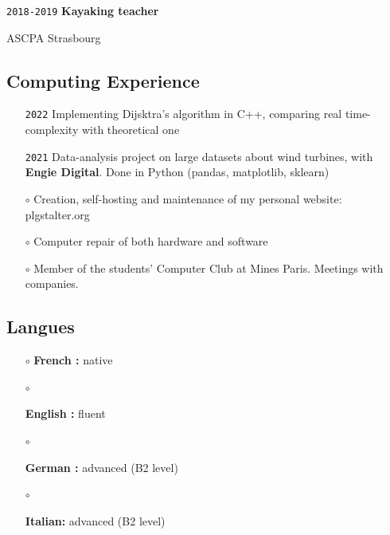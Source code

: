 \documentclass{article}
\begin{document}
\begin{multicols}{2}
		\noindent\texttt{2018-2019} \textbf{Kayaking teacher}

		ASCPA Strasbourg

\hfill

{\color{blue} \subsection*{Computing Experience}}

		\begin{itemize}
			\item[\texttt{2022}]
				Implementing Dijsktra's algorithm in C++, comparing real time-complexity with theoretical one
	
			\hfill

			\item[\texttt{2021}]
				Data-analysis project on large datasets about wind turbines, with \textbf{Engie Digital}. Done in Python (pandas, matplotlib, sklearn)

			\hfill

			\item[$\circ$]
				Creation, self-hosting and maintenance of my personal website: plgstalter.org
		
			\hfill

			\item[$\circ$]
				Computer repair of both hardware and software

			\hfill

			\item[$\circ$]
				Member of the students' Computer Club at Mines Paris. Meetings with companies.
		\end{itemize}

\columnbreak
	{\color{blue} \subsection*{Langues}}

		\begin{itemize}
			\item[$\circ$]
			\textbf{French : } native
		\item[$\circ$]

			\textbf{English : } fluent
		\item[$\circ$]

			\textbf{German :} advanced (B2 level)
		\item[$\circ$]

			\textbf{Italian:} advanced (B2 level)
		\end{itemize}


\end{multicols}
\end{document}
